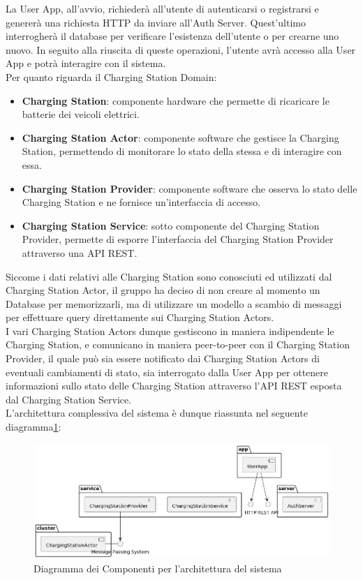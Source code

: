 La User App, all'avvio, richiederà all'utente di autenticarsi o registrarsi e genererà una richiesta
HTTP da inviare all'Auth Server. Quest'ultimo interrogherà il database per verificare l'esistenza
dell'utente o per crearne uno nuovo. In seguito alla riuscita di queste operazioni, l'utente avrà
accesso alla User App e potrà interagire con il sistema.\\

Per quanto riguarda il Charging Station Domain:
\begin{itemize}
    \item \textbf{Charging Station}: componente hardware che permette di ricaricare le batterie
          dei veicoli elettrici.
    \item \textbf{Charging Station Actor}: componente software che gestisce la Charging Station,
          permettendo di monitorare lo stato della stessa e di interagire con essa.
    \item \textbf{Charging Station Provider}: componente software che osserva lo stato delle
          Charging Station e ne fornisce un'interfaccia di accesso.
    \item \textbf{Charging Station Service}: sotto componente del Charging Station Provider,
          permette di esporre l'interfaccia del Charging Station Provider attraverso una API REST. \\
\end{itemize}

Siccome i dati relativi alle Charging Station sono conosciuti ed utilizzati dal Charging Station Actor,
il gruppo ha deciso di non creare al momento un Database per memorizzarli, ma di utilizzare un modello
a scambio di messaggi per effettuare query direttamente sui Charging Station Actors.\\

I vari Charging Station Actors dunque gestiscono in maniera indipendente le Charging Station,
e comunicano in maniera peer-to-peer con il Charging Station Provider, il quale può sia essere notificato
dai Charging Station Actors di eventuali cambiamenti di stato, sia interrogato dalla User App
per ottenere informazioni sullo stato delle Charging Station attraverso l'API REST esposta dal
Charging Station Service.\\

L'architettura complessiva del sistema è dunque riassunta nel seguente diagramma\ref{fig:architecture}:

\begin{figure}[htbp]
    \centering
    \includegraphics[width=\textwidth]{images/architecture.png}
    \caption{Diagramma dei Componenti per l'architettura del sistema}
    \label{fig:architecture}
\end{figure}

